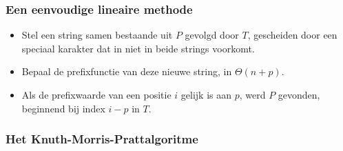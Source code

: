 \subsubsection{Een eenvoudige lineaire methode}
\begin{itemize}
    \item Stel een string samen bestaande uit $P$ gevolgd door $T$, gescheiden door een speciaal karakter dat in niet in beide strings voorkomt.
    \item Bepaal de prefixfunctie van deze nieuwe string, in $\Theta(n + p)$.
    \item Als de prefixwaarde van een positie $i$ gelijk is aan $p$, werd $P$ gevonden, beginnend bij index $i - p$ in $T$.
\end{itemize}


\subsubsection{Het Knuth-Morris-Prattalgoritme}
